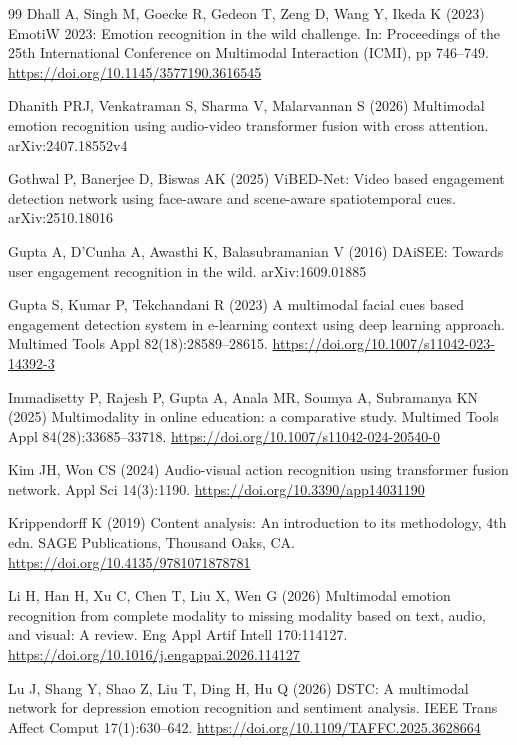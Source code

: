 \documentclass[pdflatex,iicol,sn-basic]{sn-jnl}
\begin{document}
\begin{thebibliography}{99}
Dhall A, Singh M, Goecke R, Gedeon T, Zeng D, Wang Y, Ikeda K (2023) EmotiW 2023: Emotion recognition in the wild challenge. In: Proceedings of the 25th International Conference on Multimodal Interaction (ICMI), pp 746--749. \url{https://doi.org/10.1145/3577190.3616545}

Dhanith PRJ, Venkatraman S, Sharma V, Malarvannan S (2026) Multimodal emotion recognition using audio-video transformer fusion with cross attention. arXiv:2407.18552v4

Gothwal P, Banerjee D, Biswas AK (2025) ViBED-Net: Video based engagement detection network using face-aware and scene-aware spatiotemporal cues. arXiv:2510.18016

Gupta A, D'Cunha A, Awasthi K, Balasubramanian V (2016) DAiSEE: Towards user engagement recognition in the wild. arXiv:1609.01885

Gupta S, Kumar P, Tekchandani R (2023) A multimodal facial cues based engagement detection system in e-learning context using deep learning approach. Multimed Tools Appl 82(18):28589--28615. \url{https://doi.org/10.1007/s11042-023-14392-3}

Immadisetty P, Rajesh P, Gupta A, Anala MR, Soumya A, Subramanya KN (2025) Multimodality in online education: a comparative study. Multimed Tools Appl 84(28):33685--33718. \url{https://doi.org/10.1007/s11042-024-20540-0}

Kim JH, Won CS (2024) Audio-visual action recognition using transformer fusion network. Appl Sci 14(3):1190. \url{https://doi.org/10.3390/app14031190}

Krippendorff K (2019) Content analysis: An introduction to its methodology, 4th edn. SAGE Publications, Thousand Oaks, CA. \url{https://doi.org/10.4135/9781071878781}

Li H, Han H, Xu C, Chen T, Liu X, Wen G (2026) Multimodal emotion recognition from complete modality to missing modality based on text, audio, and visual: A review. Eng Appl Artif Intell 170:114127. \url{https://doi.org/10.1016/j.engappai.2026.114127}

Lu J, Shang Y, Shao Z, Liu T, Ding H, Hu Q (2026) DSTC: A multimodal network for depression emotion recognition and sentiment analysis. IEEE Trans Affect Comput 17(1):630--642. \url{https://doi.org/10.1109/TAFFC.2025.3628664}


\end{thebibliography}
\end{document}
